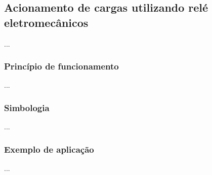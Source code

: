 \documentclass{article}
\begin{document}
\subsection{Acionamento de cargas utilizando relé eletromecânicos}
...

\subsubsection{Princípio de funcionamento}
...

\subsubsection{Simbologia}
...

\subsubsection{Exemplo de aplicação}
...



\end{document}
